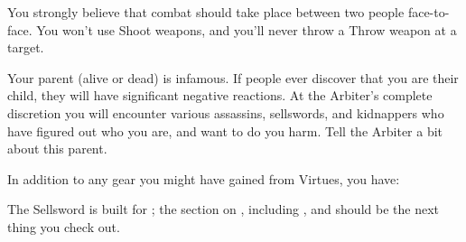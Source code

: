 \begin{multicols*}{2}
    You strongly believe that combat should take place between two people face-to-face. You won't use Shoot weapons, and you'll never throw a Throw weapon at a target.


    Your parent (alive or dead) is infamous. If people ever discover that you are their child, they will have significant negative reactions. At the Arbiter's complete discretion you will encounter various assassins, sellswords, and kidnappers who have figured out who you are, and want to do you harm. Tell the Arbiter a bit about this parent.

 

    In addition to any gear you might have gained from Virtues, you have:




    The Sellsword is built for ; the section on , including , and  should be the next thing you check out.



\end{multicols*}

